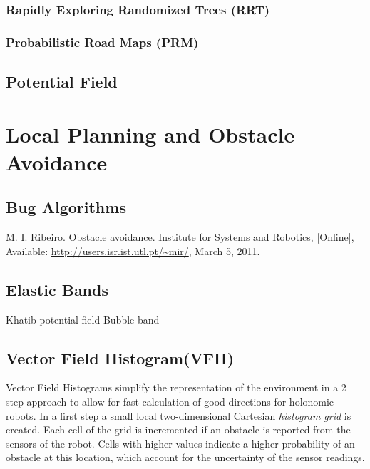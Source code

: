 \subsubsection{Rapidly Exploring Randomized Trees (RRT)}
\subsubsection{Probabilistic Road Maps (PRM)}
\subsection{Potential Field}

\section{Local Planning and Obstacle Avoidance}\label{sec:local}
\subsection{Bug Algorithms}

M. I. Ribeiro. Obstacle avoidance. Institute for Systems and Robotics, [Online], Available:  \url{http://users.isr.ist.utl.pt/~mir/}, March 5, 2011.

\subsection{Elastic Bands}
Khatib potential field Bubble band

\subsection{Vector Field Histogram(VFH)}
Vector Field Histograms \cite{borenstein1991vector} simplify the representation of the environment in a 2 step approach to allow for fast calculation of good directions for holonomic robots.
In a first step a small local two-dimensional Cartesian \emph{histogram grid} is created.
Each cell of the grid is incremented if an obstacle is reported from the sensors of the robot. 
Cells with higher values indicate a higher probability of an obstacle at this location, which account for the uncertainty of the sensor readings. 

